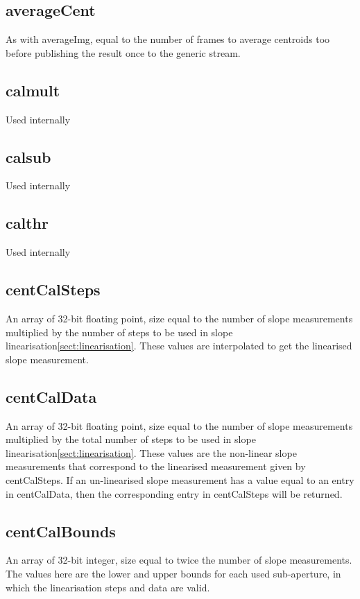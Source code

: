 \documentclass[a4,10pt]{article}
\begin{document}
\subsection{averageCent}
As with averageImg, equal to the number of frames to average centroids
too before publishing the result once to the generic stream.

\subsection{calmult}
Used internally
\subsection{calsub}
Used internally
\subsection{calthr}
Used internally
\subsection{centCalSteps}
An array of 32-bit floating point, size equal to the number of slope
measurements multiplied by the number of steps to be used in slope
linearisation\ref{sect:linearisation}.  These values are interpolated
to get the linearised slope measurement.

\subsection{centCalData}
An array of 32-bit floating point, size equal to the number of slope
measurements multiplied by the total number of steps to be used in
slope linearisation\ref{sect:linearisation}.  These values are the
non-linear slope measurements that correspond to the linearised
measurement given by centCalSteps.  If an un-linearised slope
measurement has a value equal to an entry in centCalData, then the
corresponding entry in centCalSteps will be returned.

\subsection{centCalBounds}
An array of 32-bit integer, size equal to twice the number of slope
measurements.  The values here are the lower and upper bounds for each
used sub-aperture, in which the linearisation steps and data are valid.
\end{document}
